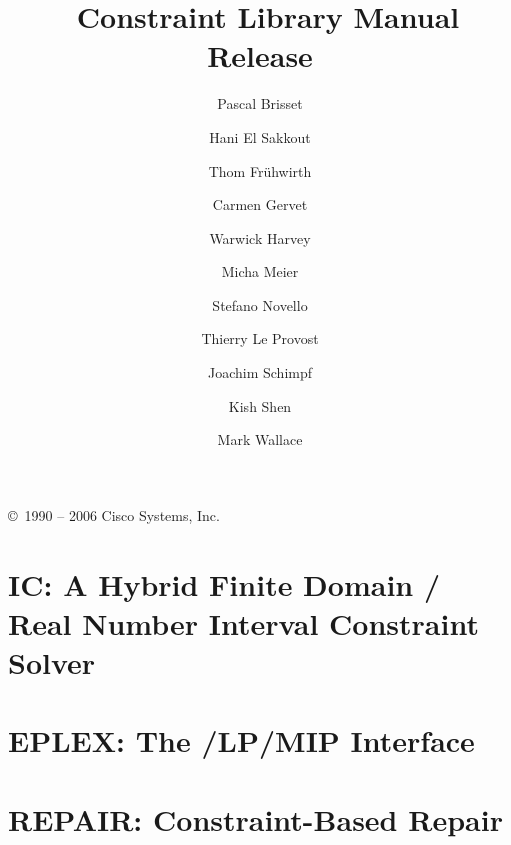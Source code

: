 \documentclass[11pt,a4paper]{book}
\title{{\Huge \eclipse\ Constraint Library Manual}\\
	\vspace{1cm}
	Release \eclipseversion
    }
\author{
Pascal Brisset
\and Hani El Sakkout
\and Thom Fr\"{u}hwirth
\and Carmen Gervet
\and Warwick Harvey
\and Micha Meier
\and Stefano Novello
\and Thierry Le Provost
\and Joachim Schimpf
\and Kish Shen
\and Mark Wallace}
\begin{document}
\maketitle

\setcounter{page}{2}
\pagestyle{empty}

\vfill

\copyright\ 1990 -- 2006 Cisco Systems, Inc. 

\bigskip\bigskip\bigskip\bigskip\bigskip\bigskip

\cleardoublepage
\pagestyle{plain}

\tableofcontents

\cleardoublepage
{}





\chapter{IC: A Hybrid Finite Domain / Real Number Interval Constraint Solver}
\label{chapic}












\chapter{EPLEX: The \eclipse/LP/MIP Interface}
\label{chapeplex}


\chapter{REPAIR: Constraint-Based Repair}
\label{chaprepair}




\newpage
\printindex
\newpage


\end{document}
